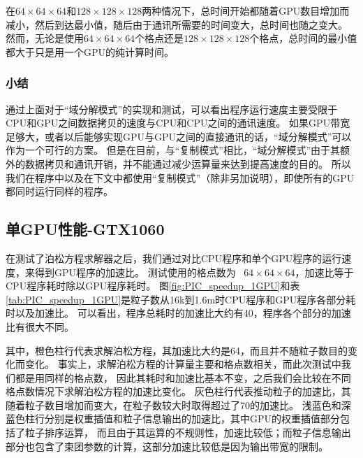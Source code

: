 在$64 \times 64 \times 64$和$128 \times 128 \times 128$两种情况下，总时间开始都随着GPU数目增加而减小，然后到达最小值，随后由于通讯所需要的时间变大，总时间也随之变大。
然而，无论是使用$64 \times 64 \times 64$个格点还是$128 \times 128 \times 128$个格点，总时间的最小值都大于只是用一个GPU的纯计算时间。
\subsubsection{小结}
通过上面对于“域分解模式”的实现和测试，可以看出程序运行速度主要受限于CPU和GPU之间数据拷贝的速度与CPU和CPU之间的通讯速度。
如果GPU带宽足够大，或者以后能够实现GPU与GPU之间的直接通讯的话，“域分解模式”可以作为一个可行的方案。
但是在目前，与“复制模式”相比，“域分解模式”由于其额外的数据拷贝和通讯开销，并不能通过减少运算量来达到提高速度的目的。
所以我们在程序中以及在下文中都使用“复制模式”（除非另加说明），即使所有的GPU都同时运行同样的程序。

\subsection{单GPU性能-GTX1060}      \label{section:PIC_Performance_GTX1060}
在测试了泊松方程求解器之后，我们通过对比CPU程序和单个GPU程序的运行速度，来得到GPU程序的加速比。
测试使用的格点数为~ $64 \times 64 \times 64$，加速比等于CPU程序耗时除以GPU程序耗时。
图\ref{fig:PIC_speedup_1GPU}和表\ref{tab:PIC_speedup_1GPU}是粒子数从16k到1.6m时CPU程序和GPU程序各部分耗时以及加速比。
可以看出，程序总耗时的加速比大约有40，程序各个部分的加速比有很大不同。

其中，橙色柱行代表求解泊松方程，其加速比大约是64，而且并不随粒子数目的变化而变化。
事实上，求解泊松方程的计算量主要和格点数相关，而此次测试中我们都是用同样的格点数，
因此其耗时和加速比基本不变，之后我们会比较在不同格点数情况下求解泊松方程的加速比变化。
灰色柱行代表推动粒子的加速比，其随着粒子数目增加而变大，在粒子数较大时取得超过了70的加速比。
浅蓝色和深蓝色柱行分别是权重插值和粒子信息输出的加速比，其中GPU的权重插值部分包括了粒子排序运算，
而且由于其运算的不规则性，加速比较低；而粒子信息输出部分也包含了束团参数的计算，这部分加速比较低是因为输出带宽的限制。


